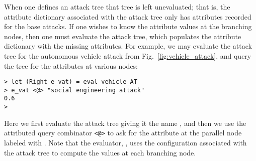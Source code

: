 When one defines an attack tree that tree is left unevaluated; that
is, the attribute dictionary associated with the attack tree only has
attributes recorded for the base attacks.  If one wishes to know the
attribute values at the branching nodes, then one must evaluate the
attack tree, which populates the attribute dictionary with the missing
attributes.  For example, we may evaluate the attack tree for the
autonomous vehicle attack from Fig.~\ref{fig:vehicle_attack}, and
query the tree for the attributes at various nodes:
\begin{mdframed}
\scriptsize
\begin{verbatim}
> let (Right e_vat) = eval vehicle_AT
> e_vat <@> "social engineering attack"
0.6
> 
\end{verbatim}  
\end{mdframed}
Here we first evaluate the attack tree  giving it the
name , and then we use the attributed query combinator
\verb!<@>! to ask for the attribute at the parallel node labeled with
. Note that the evaluator, ,
uses the configuration associated with the attack tree to compute the
values at each branching node.

